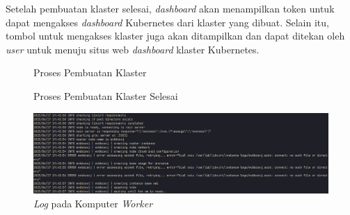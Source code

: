 Setelah pembuatan klaster selesai, \emph{dashboard} akan menampilkan
token untuk dapat mengakses \emph{dashboard} Kubernetes dari klaster
yang dibuat. Selain itu, tombol untuk mengakses klaster juga akan ditampilkan
dan dapat ditekan oleh \emph{user} untuk menuju situs web \emph{dashboard}
klaster Kubernetes.

\begin{figure}[H]
  \centering
  \caption{Proses Pembuatan Klaster}
  \label{fig:proses-pembuatan-klaster}
\end{figure}

\begin{figure}[H]
  \centering
  \caption{Proses Pembuatan Klaster Selesai}
  \label{fig:proses-pembuatan-klaster-selesai}
\end{figure}

\begin{figure}[H]
  \centering
  \includegraphics[scale=0.3]{gambar/worker-create-cluster-process-local.png}
  \caption{\emph{Log} pada Komputer \emph{Worker}}
  \label{fig:worker-create-cluster-process-local}
\end{figure}

